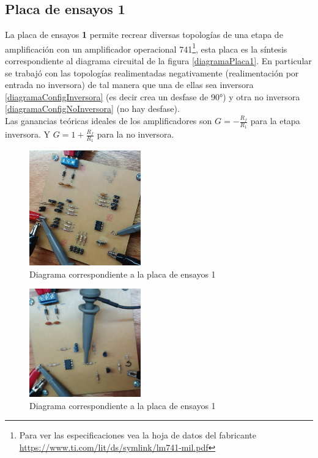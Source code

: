 \documentclass[letterpaper, 10 pt, conference]{ieeeconf}  %
\begin{document}
\subsection{Placa de ensayos 1}
La placa de ensayos \textbf{1} permite recrear diversas topologías de una etapa de amplificación con un amplificador operacional 741\footnote{Para ver las especificaciones vea la hoja de datos del fabricante \href{https://www.ti.com/lit/ds/symlink/lm741-mil.pdf}{https://www.ti.com/lit/ds/symlink/lm741-mil.pdf}}, esta placa es la síntesis correspondiente al diagrama circuital de la figura \ref{diagramaPlaca1}. En particular se trabajó con las topologías realimentadas negativamente (realimentación por entrada no inversora) de tal manera que una de ellas sea inversora \ref{diagramaConfigInversora} (es decir crea un desfase de 90°) y otra no inversora \ref{diagramaConfigNoInversora} (no hay desfase). \\
\hspace*{3pt} Las ganancias teóricas ideales de los amplificadores son $G=-\frac{R_f}{R_1}$ para la etapa inversora. Y $G=1+\frac{R_f}{R_1}$ para la no inversora.
\begin{figure}[H]
  \centering
  \includegraphics[width=0.43\textwidth]{./placaDePruebas1.jpeg}
  \caption{Diagrama correspondiente a la placa de ensayos 1}
  \label{placaDePruebas1}
\end{figure}
\begin{figure}[H]
  \centering
  \includegraphics[width=0.43\textwidth]{./placaDePruebas2.jpeg}
  \caption{Diagrama correspondiente a la placa de ensayos 1}
  \label{placaDePruebas2}
\end{figure}
\end{document}
